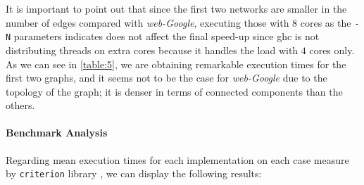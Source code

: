 \begin{table}[H]
  \centering
 \caption{Execution times}
 \label{table:5}
 \end{table}

It is important to point out that since the first two networks are smaller in the number of edges compared with \emph{web-Google}, 
executing those with $8$ cores as the \texttt{-N} parameters indicates does not affect the final speed-up since \acrshort{ghc} 
is not distributing threads on extra cores because it handles the load with $4$ cores only.
As we can see in \autoref{table:5}, we are obtaining remarkable execution times for the first two graphs, and it seems not to be the case 
for \textit{web-Google} due to the topology of the graph; it is denser in terms of connected components than the others.

\paragraph{Benchmark Analysis} Regarding mean execution times for each implementation on each case measure by \texttt{criterion} library \cite{criterion}, we can display the following results:

\begin{table}[H]
  \centering
 \caption{Mean Execution times}
 \label{table:6}
 \end{table}

